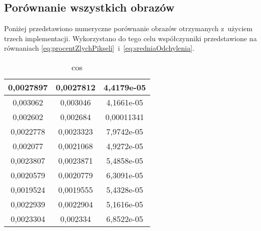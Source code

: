 \subsection{Porównanie wszystkich obrazów}
\label{subsec:porownanieNumerycznePoprawnosc}

Poniżej przedstawiono numeryczne porównanie obrazów otrzymanych z~użyciem trzech implementacji. Wykorzystano do tego celu współczynniki przedstawione na równaniach \ref{eq:procentZlychPikseli}~i~\ref{eq:sredniaOdchylenia}.

\begin{table}
\caption{cos}
\label{tab:cos}
\begin{tabular}{|c|c|c|}
\hline
0,0027897 & 0,0027812 & 4,4179e-05 \\ \hline
0,003062 & 0,003046 & 4,1661e-05 \\ \hline
0,002602 & 0,002684 & 0,00011341 \\ \hline
0,0022778 & 0,0023323 & 7,9742e-05 \\ \hline
0,002077 & 0,0021068 & 4,9272e-05 \\ \hline
0,0023807 & 0,0023871 & 5,4858e-05 \\ \hline
0,0020579 & 0,0020779 & 6,3091e-05 \\ \hline
0,0019524 & 0,0019555 & 5,4328e-05 \\ \hline
0,0022939 & 0,0022904 & 5,1616e-05 \\ \hline
0,0023304 & 0,002334 & 6,8522e-05 \\ \hline

\end{tabular}
\end{table}

